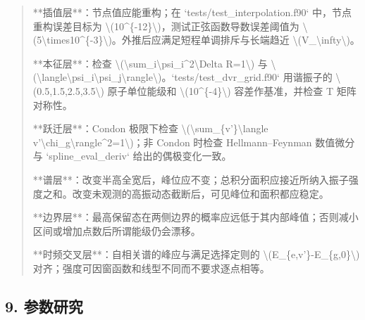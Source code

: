 \documentclass[UTF8,openany,11pt,fontset=fandol]{ctexbook}
\begin{document}
\begin{quote}
**插值层**：节点值应能重构；在 `tests/test\_interpolation.f90`
中，节点重构误差目标为
\textbackslash(10\^{}\{-12\}\textbackslash)，测试正弦函数导数误差阈值为
\textbackslash(5\textbackslash times10\^{}\{-3\}\textbackslash)。外推后应满足短程单调排斥与长端趋近
\textbackslash(V\_\textbackslash infty\textbackslash)。

**本征层**：检查
\textbackslash(\textbackslash sum\_i\textbar\textbackslash psi\_i\textbar\^{}2\textbackslash Delta
R=1\textbackslash) 与
\textbackslash(\textbackslash langle\textbackslash psi\_i\textbar\textbackslash psi\_j\textbackslash rangle\textbackslash)。`tests/test\_dvr\_grid.f90`
用谐振子的 \textbackslash(0.5,1.5,2.5,3.5\textbackslash) 原子单位能级和
\textbackslash(10\^{}\{-4\}\textbackslash) 容差作基准，并检查 T
矩阵对称性。

**跃迁层**：Condon 极限下检查
\textbackslash(\textbackslash sum\_\{v'\}\textbar\textbackslash langle
v'\textbar\textbackslash chi\_g\textbackslash rangle\textbar\^{}2=1\textbackslash)；非
Condon 时检查 Hellmann--Feynman 数值微分与 `spline\_eval\_deriv`
给出的偶极变化一致。

**谱层**：改变半高全宽后，峰位应不变；总积分面积应接近所纳入振子强度之和。改变未观测的高振动态截断后，可见峰位和面积都应稳定。

**边界层**：最高保留态在两侧边界的概率应远低于其内部峰值；否则减小区间或增加点数后所谓能级仍会漂移。

**时频交叉层**：自相关谱的峰应与满足选择定则的
\textbackslash(E\_\{e,v'\}-E\_\{g,0\}\textbackslash)
对齐；强度可因窗函数和线型不同而不要求逐点相等。
\end{quote}

\subsection{\texorpdfstring{\textbf{9.
参数研究}}{9. 参数研究}}\label{ux53c2ux6570ux7814ux7a76}
\end{document}
